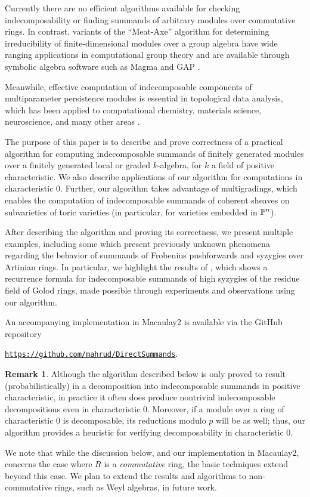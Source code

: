 \documentclass[12pt]{article}
\theoremstyle{theorem}
\numberwithin{thm}{section}
\theoremstyle{definition}
\newtheorem{rem}[thm]{Remark}
\begin{document}
Currently there are no efficient algorithms available for checking indecomposability or finding summands of arbitrary modules over commutative rings. In contrast, variants of the ``Meat-Axe'' algorithm for determining irreducibility of finite-dimensional modules over a group algebra have wide ranging applications in computational group theory \cite{Parker84,HR94,Holt98} and are available through symbolic algebra software such as Magma and GAP \cite{MAGMA,GAP}.

Meanwhile, effective computation of indecomposable components of multiparameter persistence modules is essential in topological data analysis, which has been applied to computational chemistry, materials science, neuroscience, and many other areas \cite{BL23}.

The purpose of this paper is to describe and prove correctness of a practical algorithm for computing indecomposable summands of finitely generated modules over a finitely generated local or graded $k$-algebra, for $k$ a field of positive characteristic. We also describe applications of our algorithm for computations in characteristic 0. Further, our algorithm takes advantage of multigradings, which enables the computation of indecomposable summands of coherent sheaves on subvarieties of toric varieties (in particular, for varieties embedded in $\P^n$).

After describing the algorithm and proving its correctness, we present multiple examples, including some which present previously unknown phenomena regarding the behavior of summands of Frobenius pushforwards and syzygies over Artinian rings. In particular, we highlight the results of \cite{CDE24}, which shows a recurrence formula for indecomposable summands of high syzygies of the residue field of Golod rings, made possible through experiments and observations using our algorithm.

An accompanying implementation in Macaulay2 \cite{M2} is available via the GitHub repository \\
\centerline{
  \href{https://github.com/mahrud/DirectSummands}
  {\texttt{https://github.com/mahrud/DirectSummands}}.}


\begin{rem}
Although the algorithm described below is only proved to result (probabilistically) in a decomposition into indecomposable summands in positive characteristic, in practice it often does produce nontrivial indecomposable decompositions even in characteristic 0. Moreover, if a module over a ring of characteristic 0 is decomposable, its reductions modulo $p$ will be as well; thus, our algorithm provides a heuristic for verifying decomposability in characteristic 0.

  We note that while the discussion below, and our implementation in Macaulay2, concerns the case where $R$ is a \emph{commutative} ring, the basic techniques extend beyond this case. We plan to extend the results and algorithms to non-commutative rings, such as Weyl algebras, in future work.
\end{rem}
\end{document}
